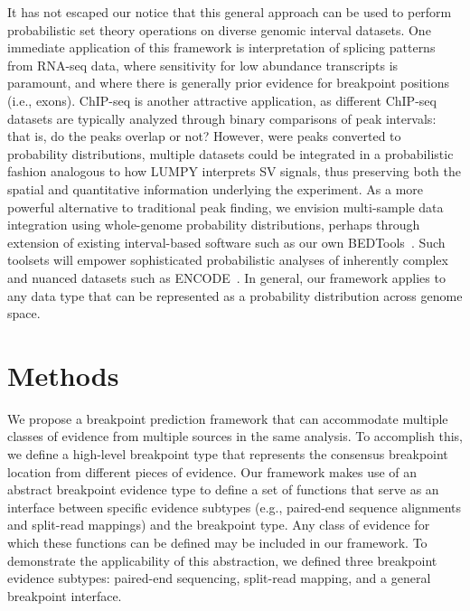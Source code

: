 \documentclass[10pt]{bmc_article}
\newenvironment{bmcformat}{\begin{raggedright}\baselineskip20pt\sloppy\setboolean{publ}{false}}{\end{raggedright}\baselineskip20pt\sloppy}
\begin{document}
\begin{bmcformat}

It has not escaped our notice that this general approach can be used to perform
probabilistic set theory operations on diverse genomic interval datasets. One
immediate application of this framework is interpretation of splicing patterns
from RNA-seq data, where sensitivity for low abundance transcripts is paramount,
and where there is generally prior evidence for breakpoint positions (i.e.,
exons). ChIP-seq is another attractive application, as different ChIP-seq
datasets are typically analyzed through binary comparisons of peak intervals:
that is, do the peaks overlap or not? However, were peaks converted to
probability distributions, multiple datasets could be integrated in a
probabilistic fashion analogous to how LUMPY interprets SV signals, thus
preserving both the spatial and quantitative information underlying the
experiment. As a more powerful alternative to traditional peak finding, we
envision multi-sample data integration using whole-genome probability
distributions, perhaps through extension of existing interval-based software
such as our own BEDTools~\cite{quinlan2010a}. Such toolsets will empower
sophisticated probabilistic analyses of inherently complex and nuanced datasets
such as ENCODE~\cite{encode2012}. In general, our framework applies to any data
type that can be represented as a probability distribution across genome space.


\section*{Methods}

We propose a breakpoint prediction framework that can accommodate multiple
classes of evidence from multiple sources in the same analysis.  To accomplish
this, we define a high-level breakpoint type that represents the consensus
breakpoint location from different pieces of evidence.  Our framework makes use
of an abstract breakpoint evidence type to define a set of functions that serve
as an interface between specific evidence subtypes (e.g., paired-end sequence
alignments and split-read mappings) and the breakpoint type.  Any class of
evidence for which these functions can be defined may be included in our
framework.  To demonstrate the applicability of this abstraction, we defined
three breakpoint evidence subtypes: paired-end sequencing, split-read mapping,
and a general breakpoint interface.


\end{bmcformat}
\end{document}
